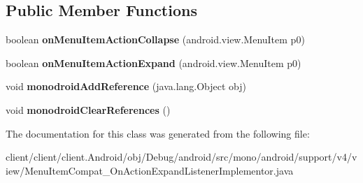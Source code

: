 \subsection*{Public Member Functions}
\begin{DoxyCompactItemize}
\item 
\hypertarget{classmono_1_1android_1_1support_1_1v4_1_1view_1_1MenuItemCompat__OnActionExpandListenerImplementor_a9ea5677e5f21bf5c3aa69d8242db44aa}{}boolean {\bfseries on\+Menu\+Item\+Action\+Collapse} (android.\+view.\+Menu\+Item p0)\label{classmono_1_1android_1_1support_1_1v4_1_1view_1_1MenuItemCompat__OnActionExpandListenerImplementor_a9ea5677e5f21bf5c3aa69d8242db44aa}

\item 
\hypertarget{classmono_1_1android_1_1support_1_1v4_1_1view_1_1MenuItemCompat__OnActionExpandListenerImplementor_adc73b3f61a71f2de8c3fe9e578c58463}{}boolean {\bfseries on\+Menu\+Item\+Action\+Expand} (android.\+view.\+Menu\+Item p0)\label{classmono_1_1android_1_1support_1_1v4_1_1view_1_1MenuItemCompat__OnActionExpandListenerImplementor_adc73b3f61a71f2de8c3fe9e578c58463}

\item 
\hypertarget{classmono_1_1android_1_1support_1_1v4_1_1view_1_1MenuItemCompat__OnActionExpandListenerImplementor_ae1594db9eea57bbf63d3077de01f3c24}{}void {\bfseries monodroid\+Add\+Reference} (java.\+lang.\+Object obj)\label{classmono_1_1android_1_1support_1_1v4_1_1view_1_1MenuItemCompat__OnActionExpandListenerImplementor_ae1594db9eea57bbf63d3077de01f3c24}

\item 
\hypertarget{classmono_1_1android_1_1support_1_1v4_1_1view_1_1MenuItemCompat__OnActionExpandListenerImplementor_a725ef56bb9745c14ea40b598752c24c3}{}void {\bfseries monodroid\+Clear\+References} ()\label{classmono_1_1android_1_1support_1_1v4_1_1view_1_1MenuItemCompat__OnActionExpandListenerImplementor_a725ef56bb9745c14ea40b598752c24c3}

\end{DoxyCompactItemize}


The documentation for this class was generated from the following file\+:\begin{DoxyCompactItemize}
\item 
client/client/client.\+Android/obj/\+Debug/android/src/mono/android/support/v4/view/Menu\+Item\+Compat\+\_\+\+On\+Action\+Expand\+Listener\+Implementor.\+java\end{DoxyCompactItemize}
